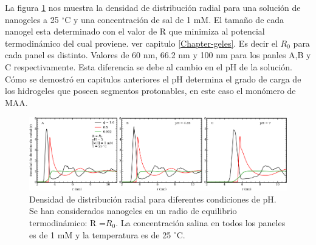 La figura \ref{fig:mc:rdf-phs-0} nos muestra la densidad de distribuci\'on radial para una soluci\'on de nanogeles a 25 $^\circ$C y una concentraci\'on de sal de 1 mM. El tama\~no de cada nanogel esta determinado con el valor de R que minimiza al potencial termodin\'amico del cual proviene. ver capitulo \ref{Chapter-geles}.  Es decir el $R_0$ para cada panel es distinto. Valores de 60 nm, 66.2 nm y 100 nm para los panles A,B y C respectivamente. Esta diferencia se debe al cambio en el pH de la soluci\'on. C\'omo se demostr\'o en capitulos anteriores el pH determina el grado de carga de los hidrogeles que poseen segmentos protonables, en este caso el mon\'omero de MAA.


\begin{figure}[!tb]
	\centering
	\includegraphics[width=1\linewidth]{Figures/graph-mc/rdf0-pHs.pdf}
	\caption{Densidad de distribuci\'on radial para diferentes condiciones de pH. Se han considerados nanogeles en un radio de equilibrio termodin\'amico: R =$R_0$.  La concentraci\'on salina en todos los paneles es de 1 mM y la temperatura es de 25 $^\circ$C.}
	\label{fig:mc:rdf-phs-0}
\end{figure}